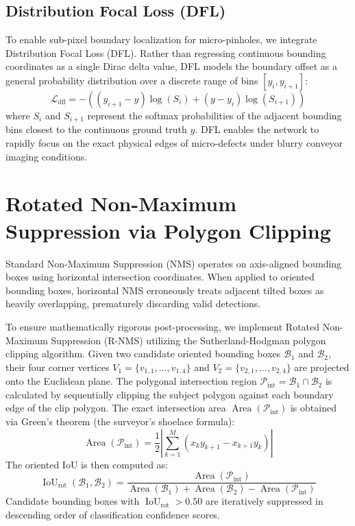 \subsection{Distribution Focal Loss (DFL)}
\label{subsec:dfl}

To enable sub-pixel boundary localization for micro-pinholes, we integrate Distribution Focal Loss (DFL). Rather than regressing continuous bounding coordinates as a single Dirac delta value, DFL models the boundary offset as a general probability distribution over a discrete range of bins $[y_i, y_{i+1}]$:
\begin{equation}
\label{eq:dfl}
\mathcal{L}_{\text{dfl}} = - \left( (y_{i+1} - y) \log(S_i) + (y - y_i) \log(S_{i+1}) \right)
\end{equation}
where $S_i$ and $S_{i+1}$ represent the softmax probabilities of the adjacent bounding bins closest to the continuous ground truth $y$. DFL enables the network to rapidly focus on the exact physical edges of micro-defects under blurry conveyor imaging conditions.

\section{Rotated Non-Maximum Suppression via Polygon Clipping}
\label{sec:rnms}

Standard Non-Maximum Suppression (NMS) operates on axis-aligned bounding boxes using horizontal intersection coordinates. When applied to oriented bounding boxes, horizontal NMS erroneously treats adjacent tilted boxes as heavily overlapping, prematurely discarding valid detections.

To ensure mathematically rigorous post-processing, we implement Rotated Non-Maximum Suppression (R-NMS) utilizing the Sutherland-Hodgman polygon clipping algorithm. Given two candidate oriented bounding boxes $\mathcal{B}_1$ and $\mathcal{B}_2$, their four corner vertices $V_1 = \{v_{1,1}, \dots, v_{1,4}\}$ and $V_2 = \{v_{2,1}, \dots, v_{2,4}\}$ are projected onto the Euclidean plane. The polygonal intersection region $\mathcal{P}_{\text{int}} = \mathcal{B}_1 \cap \mathcal{B}_2$ is calculated by sequentially clipping the subject polygon against each boundary edge of the clip polygon. The exact intersection area $\operatorname{Area}(\mathcal{P}_{\text{int}})$ is obtained via Green's theorem (the surveyor's shoelace formula):
\begin{equation}
\operatorname{Area}(\mathcal{P}_{\text{int}}) = \frac{1}{2} \left| \sum_{k=1}^{M} (x_k y_{k+1} - x_{k+1} y_k) \right|
\end{equation}
The oriented IoU is then computed as:
\begin{equation}
\operatorname{IoU}_{\text{rot}}(\mathcal{B}_1, \mathcal{B}_2) = \frac{\operatorname{Area}(\mathcal{P}_{\text{int}})}{\operatorname{Area}(\mathcal{B}_1) + \operatorname{Area}(\mathcal{B}_2) - \operatorname{Area}(\mathcal{P}_{\text{int}})}
\end{equation}
Candidate bounding boxes with $\operatorname{IoU}_{\text{rot}} > 0.50$ are iteratively suppressed in descending order of classification confidence scores.

